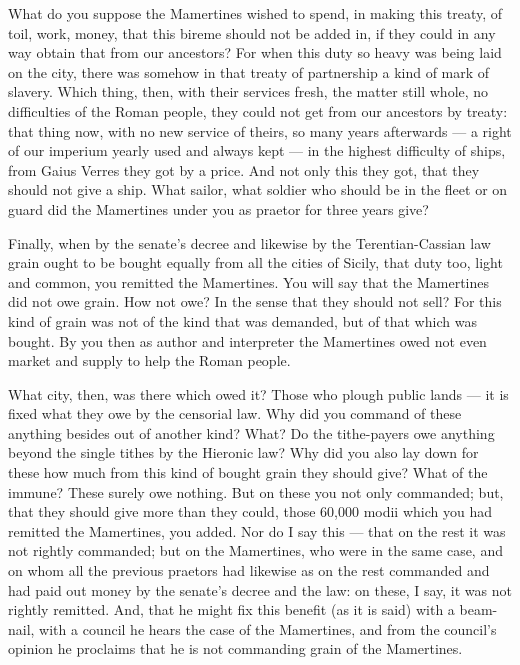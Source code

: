  What do you suppose the Mamertines wished to spend, in making this treaty, of toil, work, money, that this bireme should not be added in, if they could in any way obtain that from our ancestors? For when this duty so heavy was being laid on the city, there was somehow in that treaty of partnership a kind of mark of slavery. Which thing, then, with their services fresh, the matter still whole, no difficulties of the Roman people, they could not get from our ancestors by treaty: that thing now, with no new service of theirs, so many years afterwards --- a right of our imperium yearly used and always kept --- in the highest difficulty of ships, from Gaius Verres they got by a price. And not only this they got, that they should not give a ship. What sailor, what soldier who should be in the fleet or on guard did the Mamertines under you as praetor for three years give?

 Finally, when by the senate's decree and likewise by the Terentian-Cassian law grain ought to be bought equally from all the cities of Sicily, that duty too, light and common, you remitted the Mamertines. You will say that the Mamertines did not owe grain. How not owe? In the sense that they should not sell? For this kind of grain was not of the kind that was demanded, but of that which was bought. By you then as author and interpreter the Mamertines owed not even market and supply to help the Roman people.

 What city, then, was there which owed it? Those who plough public lands --- it is fixed what they owe by the censorial law. Why did you command of these anything besides out of another kind? What? Do the tithe-payers owe anything beyond the single tithes by the Hieronic law? Why did you also lay down for these how much from this kind of bought grain they should give? What of the immune? These surely owe nothing. But on these you not only commanded; but, that they should give more than they could, those 60,000 modii which you had remitted the Mamertines, you added. Nor do I say this --- that on the rest it was not rightly commanded; but on the Mamertines, who were in the same case, and on whom all the previous praetors had likewise as on the rest commanded and had paid out money by the senate's decree and the law: on these, I say, it was not rightly remitted. And, that he might fix this benefit (as it is said) with a beam-nail, with a council he hears the case of the Mamertines, and from the council's opinion he proclaims that he is not commanding grain of the Mamertines.

